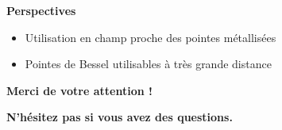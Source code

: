 \documentclass[9pt,a9paper,handout]{beamer}
\begin{document}
\begin{frame}
\begin{itemize}
        
%
    \end{itemize}
    
    \vspace*{5mm}
    {\large \textbf{Perspectives}} \vspace*{1mm}
    \begin{itemize}
        \item Utilisation en champ proche des pointes métallisées
        \item Pointes de Bessel utilisables à très grande distance
    \end{itemize}
\end{frame}

\begin{frame}
    \begin{LARGE}
    \begin{center}
    \textbf{Merci de votre attention !}
    \vspace{0.5cm}
    
    \textbf{N'hésitez pas si vous avez des questions.}
    \end{center}
    \end{LARGE}
\end{frame}
\end{document}
